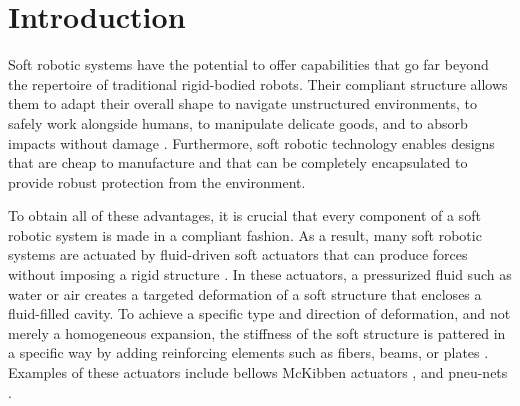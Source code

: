 \section{Introduction}
\label{sec:introduction}

Soft robotic systems have the potential to offer capabilities that go far beyond the repertoire of traditional rigid-bodied robots.
Their compliant structure allows them to adapt their overall shape to navigate unstructured environments, to safely work alongside humans, to manipulate delicate goods, and to absorb impacts without damage \cite{majidi2014soft}. 
Furthermore, soft robotic technology enables designs that are cheap to manufacture and that can be completely encapsulated to provide robust protection from the environment.


To obtain all of these advantages, it is crucial that every component of a soft robotic system is made in a compliant fashion.
As a result, many soft robotic systems are actuated by fluid-driven soft actuators that can produce forces without imposing a rigid structure \cite{grissom2006design, hawkes2017soft, marchese2014autonomous, tolley2014resilient}. 
In these actuators, a pressurized fluid such as water or air creates a targeted deformation of a soft structure that encloses a fluid-filled cavity. 
To achieve a specific type and direction of deformation, and not merely a homogeneous expansion, the stiffness of the soft structure is pattered in a specific way by adding reinforcing elements such as fibers, beams, or plates \cite{galloway2013mechanically, marchese2015recipe, rus2015design}. 
Examples of these actuators include bellows \cite{pridham1967bellows} McKibben actuators \cite{tondu2012modelling}, and pneu-nets \cite{mosadegh2014pneumatic}.


